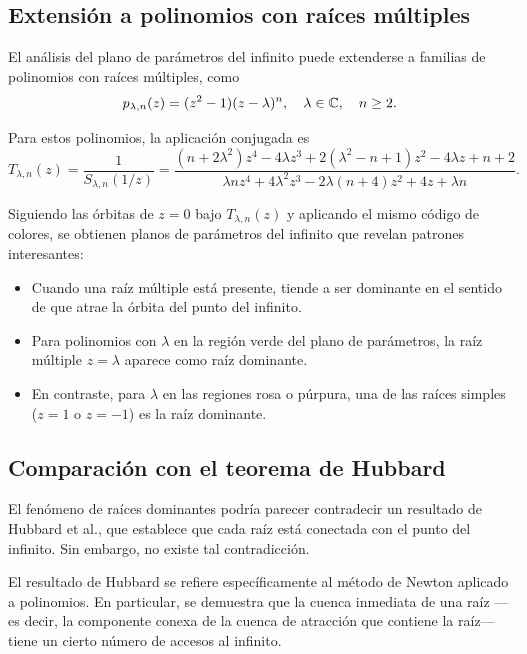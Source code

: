 \subsection{Extensión a polinomios con raíces múltiples}

El análisis del plano de parámetros del infinito puede extenderse a familias de polinomios con raíces múltiples, como
\begin{equation}
p_{\lambda,n}(z)=(z^2-1)(z-\lambda)^n, \quad \lambda\in\mathbb{C}, \quad n\ge 2.
\label{eq:familia_mult_inf}
\end{equation}

Para estos polinomios, la aplicación conjugada es
\begin{equation}
T_{\lambda,n}(z)=\frac{1}{S_{\lambda,n}(1/z)}=\frac{(n+2\lambda^2)z^4-4\lambda z^3+2(\lambda^2-n+1)z^2-4\lambda z+n+2}{\lambda n z^4+4\lambda^2 z^3-2\lambda(n+4)z^2+4z+\lambda n}.
\label{eq:T_lambda_n_inf}
\end{equation}

Siguiendo las órbitas de $z=0$ bajo $T_{\lambda,n}(z)$ y aplicando el mismo código de colores, se obtienen planos de parámetros del infinito que revelan patrones interesantes:

\begin{itemize}
\item Cuando una raíz múltiple está presente, tiende a ser dominante en el sentido de que atrae la órbita del punto del infinito.
\item Para polinomios con $\lambda$ en la región verde del plano de parámetros, la raíz múltiple $z=\lambda$ aparece como raíz dominante.
\item En contraste, para $\lambda$ en las regiones rosa o púrpura, una de las raíces simples ($z=1$ o $z=-1$) es la raíz dominante.
\end{itemize}

\subsection{Comparación con el teorema de Hubbard}

El fenómeno de raíces dominantes podría parecer contradecir un resultado de Hubbard et al., que establece que cada raíz está conectada con el punto del infinito. Sin embargo, no existe tal contradicción.

El resultado de Hubbard se refiere específicamente al método de Newton aplicado a polinomios. En particular, se demuestra que la cuenca inmediata de una raíz ---es decir, la componente conexa de la cuenca de atracción que contiene la raíz--- tiene un cierto número de accesos al infinito.

